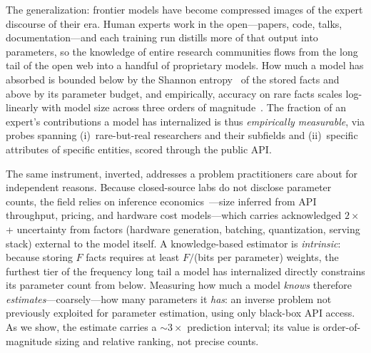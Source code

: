 \documentclass[11pt]{article}
\begin{document}
The generalization: frontier models have become compressed images of the expert discourse of their era. Human experts work in the open---papers, code, talks, documentation---and each training run distills more of that output into parameters, so the knowledge of entire research communities flows from the long tail of the open web into a handful of proprietary models. How much a model has absorbed is bounded below by the Shannon entropy~\citep{shannon1948mathematical} of the stored facts and above by its parameter budget, and empirically, accuracy on rare facts scales log-linearly with model size across three orders of magnitude~\citep{petroni2019language, roberts2020much, kandpal2023, lu2024factmemorization}. The fraction of an expert's contributions a model has internalized is thus \emph{empirically measurable}, via probes spanning (i)~rare-but-real researchers and their subfields and (ii)~specific attributes of specific entities, scored through the public API.

The same instrument, inverted, addresses a problem practitioners care about for independent reasons. Because closed-source labs do not disclose parameter counts, the field relies on inference economics~\citep{epochai2024, cai2025substitution}---size inferred from API throughput, pricing, and hardware cost models---which carries acknowledged $2\times$+ uncertainty from factors (hardware generation, batching, quantization, serving stack) external to the model itself. A knowledge-based estimator is \emph{intrinsic}: because storing $F$ facts requires at least $F/$(bits per parameter) weights, the furthest tier of the frequency long tail a model has internalized directly constrains its parameter count from below. Measuring how much a model \emph{knows} therefore \emph{estimates}---coarsely---how many parameters it \emph{has}: an inverse problem not previously exploited for parameter estimation, using only black-box API access. As we show, the estimate carries a ${\sim}3\times$ prediction interval; its value is order-of-magnitude sizing and relative ranking, not precise counts.
\end{document}
